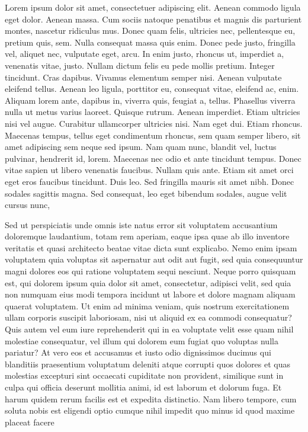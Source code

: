 Lorem ipsum dolor sit amet, consectetuer adipiscing elit. Aenean commodo ligula 
eget dolor. Aenean massa. Cum sociis natoque penatibus et magnis dis parturient 
montes, nascetur ridiculus mus. Donec quam felis, ultricies nec, pellentesque 
eu, pretium quis, sem. Nulla consequat massa quis enim. Donec pede justo, 
fringilla vel, aliquet nec, vulputate eget, arcu. In enim justo, rhoncus ut, 
imperdiet a, venenatis vitae, justo. Nullam dictum felis eu pede mollis pretium. 
Integer tincidunt. Cras dapibus. Vivamus elementum semper nisi. Aenean vulputate 
eleifend tellus. Aenean leo ligula, porttitor eu, consequat vitae, eleifend ac, 
enim. Aliquam lorem ante, dapibus in, viverra quis, feugiat a, tellus. Phasellus 
viverra nulla ut metus varius laoreet. Quisque rutrum. Aenean imperdiet. Etiam 
ultricies nisi vel augue. Curabitur ullamcorper ultricies nisi. Nam eget dui. 
Etiam rhoncus. Maecenas tempus, tellus eget condimentum rhoncus, sem quam semper 
libero, sit amet adipiscing sem neque sed ipsum. Nam quam nunc, blandit vel, 
luctus pulvinar, hendrerit id, lorem. Maecenas nec odio et ante tincidunt 
tempus. Donec vitae sapien ut libero venenatis faucibus. Nullam quis ante. Etiam 
sit amet orci eget eros faucibus tincidunt. Duis leo. Sed fringilla mauris sit 
amet nibh. Donec sodales sagittis magna. Sed consequat, leo eget bibendum 
sodales, augue velit cursus nunc, 

Sed ut perspiciatis unde omnis iste natus error sit voluptatem accusantium 
doloremque laudantium, totam rem aperiam, eaque ipsa quae ab illo inventore 
veritatis et quasi architecto beatae vitae dicta sunt explicabo. Nemo enim ipsam 
voluptatem quia voluptas sit aspernatur aut odit aut fugit, sed quia 
consequuntur magni dolores eos qui ratione voluptatem sequi nesciunt. Neque 
porro quisquam est, qui dolorem ipsum quia dolor sit amet, consectetur, adipisci 
velit, sed quia non numquam eius modi tempora incidunt ut labore et dolore 
magnam aliquam quaerat voluptatem. Ut enim ad minima veniam, quis nostrum 
exercitationem ullam corporis suscipit laboriosam, nisi ut aliquid ex ea commodi 
consequatur? Quis autem vel eum iure reprehenderit qui in ea voluptate velit 
esse quam nihil molestiae consequatur, vel illum qui dolorem eum fugiat quo 
voluptas nulla pariatur? At vero eos et accusamus et iusto odio dignissimos 
ducimus qui blanditiis praesentium voluptatum deleniti atque corrupti quos 
dolores et quas molestias excepturi sint occaecati cupiditate non provident, 
similique sunt in culpa qui officia deserunt mollitia animi, id est laborum et 
dolorum fuga. Et harum quidem rerum facilis est et expedita distinctio. Nam 
libero tempore, cum soluta nobis est eligendi optio cumque nihil impedit quo 
minus id quod maxime placeat facere 

